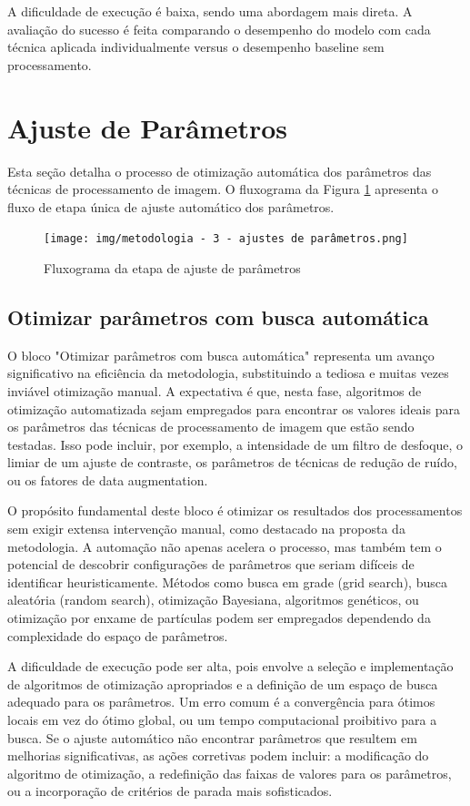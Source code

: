 A dificuldade de execução é baixa, sendo uma abordagem mais direta. A avaliação do sucesso é feita comparando o desempenho do modelo com cada técnica aplicada individualmente versus o desempenho baseline sem processamento.

\section{Ajuste de Parâmetros}

Esta seção detalha o processo de otimização automática dos parâmetros das técnicas de processamento de imagem. O fluxograma da Figura \ref{fig:fluxograma_ajuste_parametros} apresenta o fluxo de etapa única de ajuste automático dos parâmetros.

\begin{figure}[H]
    \centering
    \caption{\label{fig:fluxograma_ajuste_parametros}Fluxograma da etapa de ajuste de parâmetros}
    \texttt{[image: img/metodologia - 3 - ajustes de parâmetros.png]}
\end{figure}

\subsection{Otimizar parâmetros com busca automática}
O bloco "Otimizar parâmetros com busca automática" representa um avanço significativo na eficiência da metodologia, substituindo a tediosa e muitas vezes inviável otimização manual. A expectativa é que, nesta fase, algoritmos de otimização automatizada sejam empregados para encontrar os valores ideais para os parâmetros das técnicas de processamento de imagem que estão sendo testadas. Isso pode incluir, por exemplo, a intensidade de um filtro de desfoque, o limiar de um ajuste de contraste, os parâmetros de técnicas de redução de ruído, ou os fatores de data augmentation.

O propósito fundamental deste bloco é otimizar os resultados dos processamentos sem exigir extensa intervenção manual, como destacado na proposta da metodologia. A automação não apenas acelera o processo, mas também tem o potencial de descobrir configurações de parâmetros que seriam difíceis de identificar heuristicamente. Métodos como busca em grade (grid search), busca aleatória (random search), otimização Bayesiana, algoritmos genéticos, ou otimização por enxame de partículas podem ser empregados dependendo da complexidade do espaço de parâmetros.

A dificuldade de execução pode ser alta, pois envolve a seleção e implementação de algoritmos de otimização apropriados e a definição de um espaço de busca adequado para os parâmetros. Um erro comum é a convergência para ótimos locais em vez do ótimo global, ou um tempo computacional proibitivo para a busca. Se o ajuste automático não encontrar parâmetros que resultem em melhorias significativas, as ações corretivas podem incluir: a modificação do algoritmo de otimização, a redefinição das faixas de valores para os parâmetros, ou a incorporação de critérios de parada mais sofisticados.

